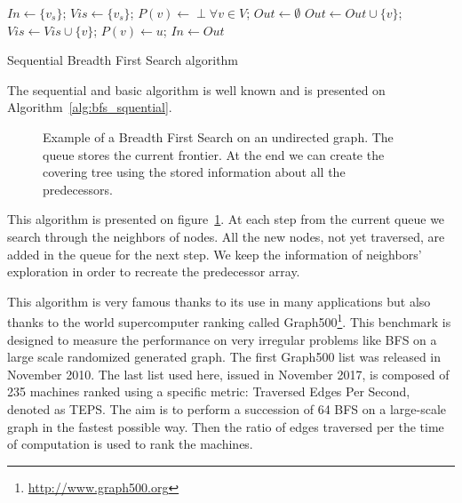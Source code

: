 \begin{algorithm}
\begin{algorithmic}[1]
\State $In \gets \{v_s\}$;
\State $Vis \gets \{v_s\}$;
\State $P(v) \gets \perp \forall v \in V$;
	\State $Out \gets \emptyset$
				\State $Out \leftarrow Out \cup \{v\}$;
				\State $Vis \gets Vis \cup \{v\}$;
				\State $P(v) \leftarrow u$;
			\EndIf
		\EndFor
	\EndFor
	\State $In \gets Out$
\EndWhile
\EndFunction
\end{algorithmic}
\caption{Sequential Breadth First Search algorithm}
\label{alg:bfs_squential}
\end{algorithm}

The sequential and basic algorithm is well known and is presented on Algorithm~\ref{alg:bfs_squential}.

\begin{figure}
\centering

\caption[The Breadth First Search and generation of predecessors]{Example of a Breadth First Search on an undirected graph. The queue stores the current frontier. At the end we can create the covering tree using the stored information about all the predecessors.}
\label{fig:part2_chap3:BFS}
\end{figure}


This algorithm is presented on figure~\ref{fig:part2_chap3:BFS}.
At each step from the current queue we search through the neighbors of nodes. 
All the new nodes, not yet traversed, are added in the queue for the next step.
We keep the information of neighbors’ exploration in order to recreate the predecessor array. 

This algorithm is very famous thanks to its use in many applications but also thanks to the world supercomputer ranking called Graph500\footnote{\url{http://www.graph500.org}}.
This benchmark is designed to measure the performance on very irregular problems like BFS on a large scale randomized generated graph. 
The first Graph500 list was released in November 2010.
The last list used here, issued in November 2017, is composed of 235 machines ranked using a specific metric: Traversed Edges Per Second, denoted as TEPS. 
The aim is to perform a succession of 64 BFS on a large-scale graph in the fastest possible way.
Then the ratio of edges traversed per the time of computation is used to rank the machines.

